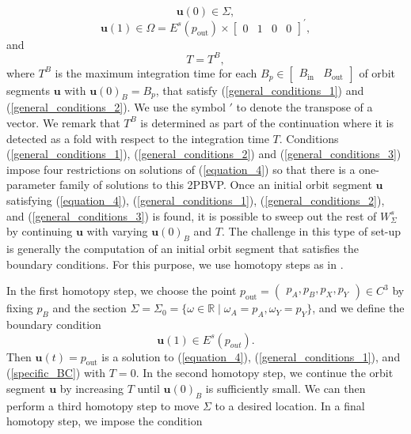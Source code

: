 \documentclass{ws-ijbc}
\begin{document}
 \begin{equation}
	\mathbf{u}(0) \in \Sigma,
	\label{general_conditions_1}
\end{equation}
\begin{equation}
	\mathbf{u}(1) \in \Omega = E^s(p_{\text{out}}) \times \begin{bmatrix} 0 & 1 & 0 & 0 \end{bmatrix}^{\prime},
	\label{general_conditions_2}
\end{equation}
and
\begin{equation}
	T=T^{B},
	\label{general_conditions_3}
\end{equation}
where $T^{B}$ is the maximum integration time for each $B_p \in \begin{bmatrix} B_{\text{in}} & B_{\text{out}} \end{bmatrix}$ of orbit segments $\mathbf{u}$ with $\mathbf{u}(0)_B=B_p$, that satisfy (\ref{general_conditions_1}) and (\ref{general_conditions_2}).  We use the symbol $\prime$ to denote the transpose of a vector.  We remark that $T^B$ is determined as part of the continuation where it is detected as a fold with respect to the integration time $T$.  Conditions (\ref{general_conditions_1}), (\ref{general_conditions_2})  and (\ref{general_conditions_3}) impose four restrictions on solutions of (\ref{equation_4}) so that there is a one-parameter family of solutions to this 2PBVP.  Once an initial orbit segment $\mathbf{u}$ satisfying (\ref{equation_4}), (\ref{general_conditions_1}), (\ref{general_conditions_2}), and (\ref{general_conditions_3}) is found, it is possible to sweep out the rest of $W^s_{\Sigma}$ by continuing $\mathbf{u}$ with varying $\mathbf{u}(0)_B$ and $T$.  The challenge in this type of set-up is generally the computation of an initial orbit segment that satisfies the boundary conditions.  For this purpose, we use homotopy steps as in  \cite{homotopy_example, Saeed_Paper}.

In the first homotopy step, we choose the point $p_{\text{out}}=\begin{pmatrix} p_A, p_B, p_X, p_Y \end{pmatrix}  \in C^3$ by fixing $p_B$ and the section $\Sigma=\Sigma_0=\{\omega \in \mathbb{R} \; | \;  \omega_A=p_A, \omega_Y=p_Y\}$, and we define the boundary condition
\begin{equation}
	\mathbf{u}(1) \in E^s(p_{out}).
	\label{specific_BC}
\end{equation}
Then $\mathbf{u}(t)=p_{\text{out}}$ is a solution to (\ref{equation_4}), (\ref{general_conditions_1}), and (\ref{specific_BC}) with $T=0$.  In the second homotopy step, we continue the orbit segment $\mathbf{u}$ by increasing $T$ until $\mathbf{u}(0)_B$ is sufficiently small.  We can then perform a third homotopy step to move $\Sigma$ to a desired location.  In a final homotopy step, we impose the condition
\end{document}
